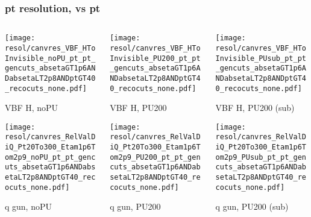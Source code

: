 \documentclass[8pt]{beamer}
\begin{document}
  \begin{frame}
  \frametitle{pt resolution, vs pt}
  
  \begin{columns}
   \begin{column}{0.35\textwidth}
     \texttt{[image: resol/canvres\_VBF\_HToInvisible\_noPU\_pt\_pt\_gencuts\_absetaGT1p6ANDabsetaLT2p8ANDptGT40\_recocuts\_none.pdf]}
     
     VBF H, noPU
    
     \texttt{[image: resol/canvres\_RelValDiQ\_Pt20To300\_Etam1p6Tom2p9\_noPU\_pt\_pt\_gencuts\_absetaGT1p6ANDabsetaLT2p8ANDptGT40\_recocuts\_none.pdf]}
     
     q gun, noPU
   \end{column}
   \begin{column}{0.35\textwidth}
     \texttt{[image: resol/canvres\_VBF\_HToInvisible\_PU200\_pt\_pt\_gencuts\_absetaGT1p6ANDabsetaLT2p8ANDptGT40\_recocuts\_none.pdf]}
     
     VBF H, PU200
    
     \texttt{[image: resol/canvres\_RelValDiQ\_Pt20To300\_Etam1p6Tom2p9\_PU200\_pt\_pt\_gencuts\_absetaGT1p6ANDabsetaLT2p8ANDptGT40\_recocuts\_none.pdf]}
     
     q gun, PU200
   \end{column}
   \begin{column}{0.35\textwidth}
     \texttt{[image: resol/canvres\_VBF\_HToInvisible\_PUsub\_pt\_pt\_gencuts\_absetaGT1p6ANDabsetaLT2p8ANDptGT40\_recocuts\_none.pdf]}
     
     VBF H, PU200 (sub)
    
     \texttt{[image: resol/canvres\_RelValDiQ\_Pt20To300\_Etam1p6Tom2p9\_PUsub\_pt\_pt\_gencuts\_absetaGT1p6ANDabsetaLT2p8ANDptGT40\_recocuts\_none.pdf]}
     
     q gun, PU200 (sub)
   \end{column}
  \end{columns}
 \end{frame}
 
\end{document}
